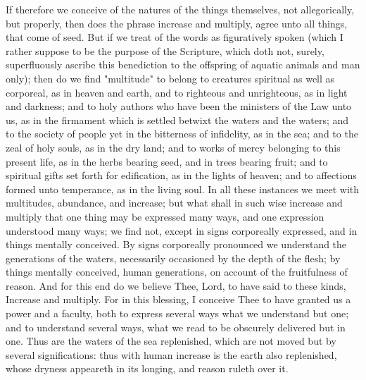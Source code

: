 \documentclass[b5paper,openright,12pt,twoside]{book}
\begin{document}
If therefore we conceive of the natures of the things themselves, not
allegorically, but properly, then does the phrase increase and multiply,
agree unto all things, that come of seed. But if we treat of the words
as figuratively spoken (which I rather suppose to be the purpose of
the Scripture, which doth not, surely, superfluously ascribe this
benediction to the offspring of aquatic animals and man only); then
do we find "multitude" to belong to creatures spiritual as well as
corporeal, as in heaven and earth, and to righteous and unrighteous, as
in light and darkness; and to holy authors who have been the ministers
of the Law unto us, as in the firmament which is settled betwixt
the waters and the waters; and to the society of people yet in the
bitterness of infidelity, as in the sea; and to the zeal of holy souls,
as in the dry land; and to works of mercy belonging to this present
life, as in the herbs bearing seed, and in trees bearing fruit; and to
spiritual gifts set forth for edification, as in the lights of heaven;
and to affections formed unto temperance, as in the living soul. In all
these instances we meet with multitudes, abundance, and increase; but
what shall in such wise increase and multiply that one thing may be
expressed many ways, and one expression understood many ways; we find
not, except in signs corporeally expressed, and in things mentally
conceived. By signs corporeally pronounced we understand the generations
of the waters, necessarily occasioned by the depth of the flesh;
by things mentally conceived, human generations, on account of the
fruitfulness of reason. And for this end do we believe Thee, Lord, to
have said to these kinds, Increase and multiply. For in this blessing, I
conceive Thee to have granted us a power and a faculty, both to express
several ways what we understand but one; and to understand several ways,
what we read to be obscurely delivered but in one. Thus are the
waters of the sea replenished, which are not moved but by several
significations: thus with human increase is the earth also replenished,
whose dryness appeareth in its longing, and reason ruleth over it.
\end{document}
